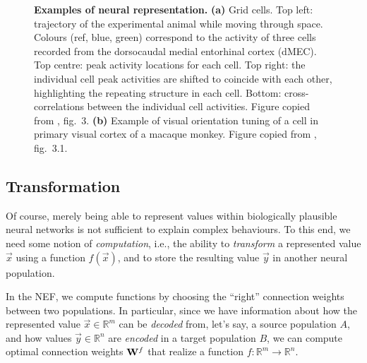 \documentclass[10pt,letterpaper,oneside]{article}
\begin{document}
\begin{figure}[t]
	\caption{\textbf{Examples of neural representation.} \textbf{(a)} Grid cells. Top left: trajectory of the experimental animal while moving through space. Colours (ref, blue, green) correspond to the activity of three cells recorded from the dorsocaudal medial entorhinal cortex (dMEC). Top centre: peak activity locations for each cell. Top right: the individual cell peak activities are shifted to coincide with each other, highlighting the repeating structure in each cell. Bottom: cross-correlations between the individual cell activities. Figure copied from \cite{hafting2005microstructure}, fig.~3. \textbf{(b)} Example of visual orientation tuning of a cell in primary visual cortex of a macaque monkey. Figure copied from \cite{eliasmith2003neural}, fig.~3.1.}
\end{figure}



\subsection{Transformation}

Of course, merely being able to represent values within biologically plausible neural networks is not sufficient to explain complex behaviours. To this end, we need some notion of \emph{computation}, i.e., the ability to \emph{transform} a represented value $\vec x$ using a function $f(\vec x)$, and to store the resulting value $\vec y$ in another neural population.

In the NEF, we compute functions by choosing the \enquote{right} connection weights between two populations. In particular, since we have information about how the represented value $\vec x \in \mathbb{R}^m$ can be \emph{decoded} from, let's say, a source population $A$, and how values $\vec y \in \mathbb{R}^n$ are \emph{encoded} in a target population $B$, we can compute optimal connection weights ${{\mathbf{W}}}^f$ that realize a function $f : \mathbb{R}^m \rightarrow \mathbb{R}^n$.
\end{document}
